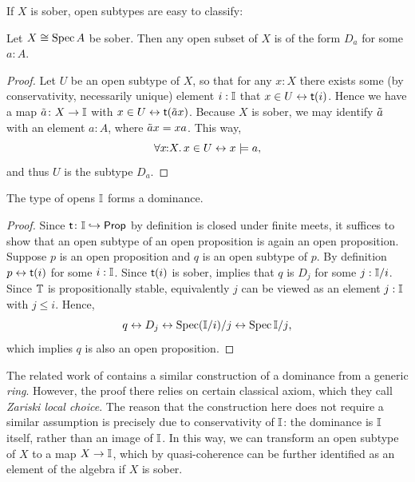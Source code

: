 If $X$ is sober, open subtypes are easy to classify:

\begin{lemma}[\AxiomSQCI]\label{lem:openofsobergivesalgebra}
  Let $X \cong \operatorname{Spec} A$ be sober. Then any open subset of $X$ is of the form $D_a$ for some $a:A$.
\end{lemma}
\begin{proof}
  Let $U$ be an open subtype of $X$, so that for any $x:X$ there exists some (by conservativity, necessarily unique) element $i:\mathbb{I}$ that $x \in U \leftrightarrow \mathsf{t}(i)$.
  Hence we have a map $\tilde{a} \colon X \to \mathbb{I}$ with $x \in U \leftrightarrow \mathsf{t}(\tilde{a}x)$. Because $X$ is sober, we may identify $\tilde{a}$ with an element $a:A$, where $\tilde{a}x = xa$. This way,
  \[ \fa xX x \in U \eq x \models a\text{,} \]
  and thus $U$ is the subtype $D_a$.
\end{proof}

\begin{proposition}[\AxiomSQCI]\label{prop:Idominance}
  The type of opens $\mathbb{I}$ forms a dominance.
\end{proposition}
\begin{proof}
  Since $\mathsf{t}\colon \mathbb{I} \hookrightarrow \mathsf{Prop}$ by definition is closed under finite meets, it suffices to show that an open subtype of an open proposition is again an open proposition. Suppose $p$ is an open proposition and $q$ is an open subtype of $p$. By definition $p \leftrightarrow \mathsf{t}(i)$ for some $i:\mathbb{I}$. Since $\mathsf{t}(i)$ is sober,  implies that $q$ is $D_j$ for some $j : \mathbb{I}/i$. Since $\mathbb{T}$ is propositionally stable, equivalently $j$ can be viewed as an element $j : \mathbb{I}$ with $j \le i$. Hence,
  \[ q \eq D_j \eq \spec(\I/i)/j \eq \spec\I/j\text{,} \]
  which implies $q$ is also an open proposition.
\end{proof}

\begin{remark}\label{rem:dominancewithoutchoice}
  The related work of \citet{Cherubini_Coquand_Hutzler_2024} contains a similar construction of a dominance from a generic \emph{ring}. However, the proof there relies on certain classical axiom, which they call \emph{Zariski local choice}. The reason that the construction here does not require a similar assumption is precisely due to conservativity of $\mathbb{I}$: the dominance is $\mathbb{I}$ itself, rather than an image of $\mathbb{I}$. In this way, we can transform an open subtype of $X$ to a map $X \to \mathbb{I}$, which by quasi-coherence can be further identified as an element of the algebra if $X$ is sober. 
\end{remark}

